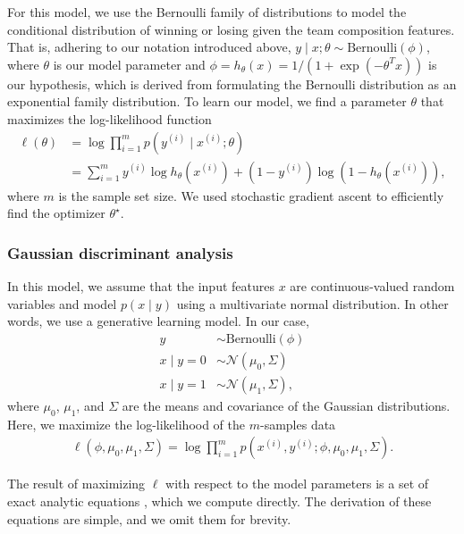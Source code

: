 \documentclass[letterpaper,10 pt,conference]{ieeeconf}
\begin{document}
For this model, we use the Bernoulli family of distributions to model the conditional distribution of winning or losing given the team composition features. That is, adhering to our notation introduced above, $y \mid x; \theta \sim \text{Bernoulli}\left(\phi\right)$, where $\theta$ is our model parameter and $\phi = h_{\theta}\left(x\right) = 1/\left(1 + \exp(-\theta^{T}x)\right)$ is our hypothesis, which is derived from formulating the Bernoulli distribution as an exponential family distribution. To learn our model, we find a parameter $\theta$ that maximizes the log-likelihood function
\begin{align}
  \ell\left(\theta\right) & = 
  \log\prod_{i=1}^{m}p\left( y^{(i)} \mid x^{(i)}; \theta \right) \\ & =
  \sum_{i=1}^{m}y^{(i)}\log h_{\theta}\left(x^{(i)}\right) + \left(1 - y^{(i)}\right)\log\left(1 - h_{\theta}\left(x^{(i)}\right)\right),
\end{align}
where $m$ is the sample set size. We used stochastic gradient ascent to efficiently find the optimizer $\theta^{\star}$. 

\subsubsection{Gaussian discriminant analysis}

In this model, we assume that the input features $x$ are continuous-valued random variables and model $p\left(x \mid y\right)$ using a multivariate normal distribution. In other words, we use a generative learning model. In our case,
\begin{align}
  y & \sim \text{Bernoulli}\left(\phi\right) \\
  x\mid y = 0 & \sim \mathcal{N}\left(\mu_{0},\Sigma\right) \\
  x\mid y = 1 & \sim \mathcal{N}\left(\mu_{1},\Sigma\right),
\end{align}
where $\mu_{0}$, $\mu_{1}$, and $\Sigma$ are the means and covariance of the Gaussian distributions. Here, we maximize the log-likelihood of the $m$-samples data
\begin{align}
  \ell\left(\phi,\mu_{0},\mu_{1},\Sigma\right) = \log\prod_{i=1}^{m}p\left( x^{(i)}, y^{(i)}; \phi,\mu_{0},\mu_{1},\Sigma \right).
\end{align}

The result of maximizing $\ell$ with respect to the model parameters is a set of exact analytic equations \cite{Ng:14}, which we compute directly. The derivation of these equations are simple, and we omit them for brevity. 
\end{document}
